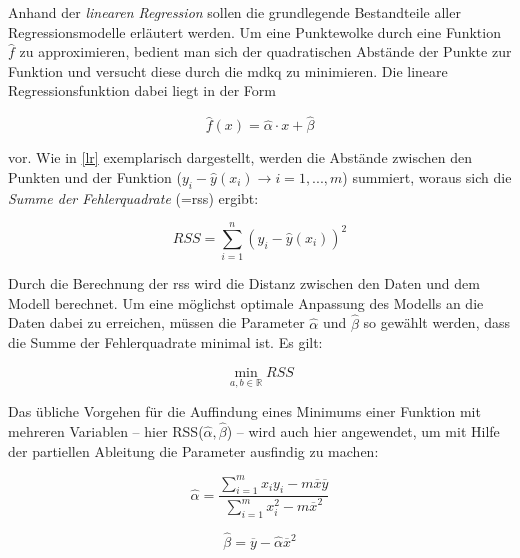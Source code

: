 Anhand der \textit{linearen Regression} sollen die grundlegende Bestandteile aller Regressionsmodelle erläutert werden. Um eine Punktewolke durch eine Funktion $\hat{f}$ zu approximieren, bedient man sich der quadratischen Abstände der Punkte zur Funktion und versucht diese durch die \gls{mdkq} zu minimieren. Die lineare Regressionsfunktion dabei liegt in der Form 

\begin{equation}
	\hat{f}(x) = \hat{\alpha} \cdot x + \hat{\beta}
	\label{lrf}
\end{equation}

vor. Wie in \vref{lr} exemplarisch dargestellt, werden die Abstände zwischen den Punkten und der Funktion ($y_i -  \hat{y}(x_i) \rightarrow i= 1,...,m$) summiert, woraus sich die \textit{Summe der Fehlerquadrate} (=\gls{rss}) ergibt:

\begin{equation}
	RSS = \sum\limits_{i=1}^n (y_i - \hat{y}(x_i))^2
\end{equation}

Durch die Berechnung der \gls{rss} wird die Distanz zwischen den Daten und dem Modell berechnet. Um eine möglichst optimale Anpassung des Modells an die Daten dabei zu erreichen, müssen die Parameter $\hat{\alpha}$ und $\hat{\beta}$ so gewählt werden, dass die Summe der Fehlerquadrate minimal ist. Es gilt:

\begin{equation}
	\min\limits_{a,b\in\mathbb{R}} RSS
\end{equation}

Das übliche Vorgehen für die Auffindung eines Minimums einer Funktion mit mehreren Variablen -- hier RSS($\hat{\alpha},\hat{\beta}$) -- wird auch hier angewendet, um mit Hilfe der partiellen Ableitung die Parameter ausfindig zu machen:

\begin{equation}
	\hat{\alpha} = \frac{\sum\limits_{i=1}^m x_i y_i - m \overline{x} \overline{y}}{\sum\limits_{i=1}^m x^2_i - m \overline{x}^2}
\end{equation}

\begin{equation}
	\hat{\beta} = \overline{y} - \hat{\alpha} \overline{x}^2
\end{equation}

